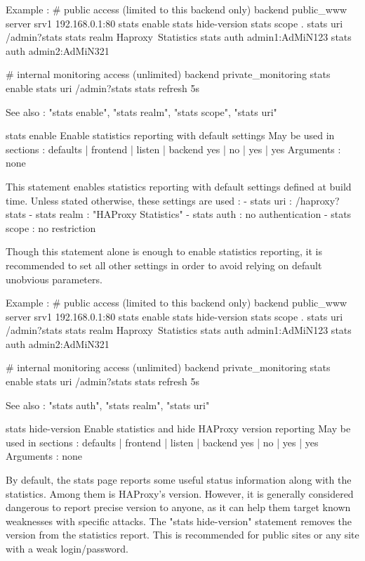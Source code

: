   Example :
    # public access (limited to this backend only)
    backend public_www
        server srv1 192.168.0.1:80
        stats enable
        stats hide-version
        stats scope   .
        stats uri     /admin?stats
        stats realm   Haproxy\ Statistics
        stats auth    admin1:AdMiN123
        stats auth    admin2:AdMiN321

    # internal monitoring access (unlimited)
    backend private_monitoring
        stats enable
        stats uri     /admin?stats
        stats refresh 5s

  See also : "stats enable", "stats realm", "stats scope", "stats uri"


stats enable
  Enable statistics reporting with default settings
  May be used in sections :   defaults | frontend | listen | backend
                                 yes   |    no    |   yes  |   yes
  Arguments : none

  This statement enables statistics reporting with default settings defined
  at build time. Unless stated otherwise, these settings are used :
    - stats uri   : /haproxy?stats
    - stats realm : "HAProxy Statistics"
    - stats auth  : no authentication
    - stats scope : no restriction

  Though this statement alone is enough to enable statistics reporting, it is
  recommended to set all other settings in order to avoid relying on default
  unobvious parameters.

  Example :
    # public access (limited to this backend only)
    backend public_www
        server srv1 192.168.0.1:80
        stats enable
        stats hide-version
        stats scope   .
        stats uri     /admin?stats
        stats realm   Haproxy\ Statistics
        stats auth    admin1:AdMiN123
        stats auth    admin2:AdMiN321

    # internal monitoring access (unlimited)
    backend private_monitoring
        stats enable
        stats uri     /admin?stats
        stats refresh 5s

  See also : "stats auth", "stats realm", "stats uri"


stats hide-version
  Enable statistics and hide HAProxy version reporting
  May be used in sections :   defaults | frontend | listen | backend
                                 yes   |    no    |   yes  |   yes
  Arguments : none

  By default, the stats page reports some useful status information along with
  the statistics. Among them is HAProxy's version. However, it is generally
  considered dangerous to report precise version to anyone, as it can help them
  target known weaknesses with specific attacks. The "stats hide-version"
  statement removes the version from the statistics report. This is recommended
  for public sites or any site with a weak login/password.

